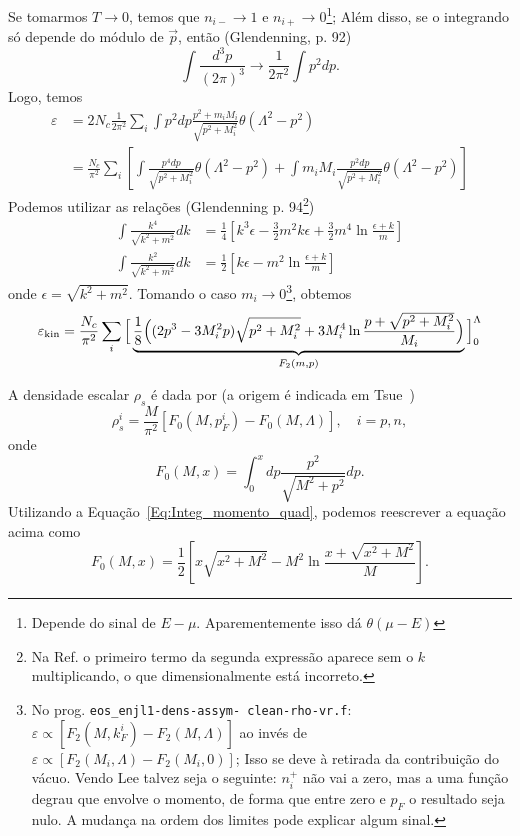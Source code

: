 Se tomarmos $T \to 0$, temos que $n_{i-} \to 1$ e $n_{i+} \to 0$\footnote{Depende do sinal de $E - \mu$. Aparementemente isso dá $\theta(\mu-E)$}; Além disso, se o integrando só depende do módulo de $\vec{p}$, então (Glendenning\cite{Glendenning}, p. 92)
\begin{equation}\label{Eq:Int_d3p_to_dp}
	\int\frac{d^3p}{(2\pi)^3} \to \frac{1}{2\pi^2}\int p^2dp.
\end{equation}
%
Logo, temos
\begin{align}
	\varepsilon &= 2 N_c \frac{1}{2\pi^2}\sum_i \int p^2 dp \frac{p^2 + m_i M_i}{\sqrt{p^2 + M_i^2}} \theta(\Lambda^2 - p^2) \\
	&= \frac{N_c}{\pi^2}\sum_i\left[\int \frac{p^4dp}{\sqrt{p^2 + M_i^2}}\theta(\Lambda^2 - p^2) + \int m_i M_i \frac{p^2 dp}{\sqrt{p^2 + M_i^2}}\theta(\Lambda^2 - p^2)\right] \label{Eq:Engergia_cin_separada}
\end{align}
%
Podemos utilizar as relações (Glendenning\cite{Glendenning} p. 94\footnote{Na Ref. o primeiro termo da segunda expressão aparece sem o $k$ multiplicando, o que dimensionalmente está incorreto.})
\begin{align}
	\int \frac{k^4}{\sqrt{k^2 + m^2}} dk &= \frac{1}{4}\left[k^3\epsilon - \frac{3}{2} m^2k\epsilon + \frac{3}{2}m^4\ln\frac{\epsilon + k}{m} \right]\\
	\int \frac{k^2}{\sqrt{k^2 + m^2}} dk &= \frac{1}{2}\left[k\epsilon - m^2\ln\frac{\epsilon + k}{m}\right] \label{Eq:Integ_momento_quad}
\end{align}
%
onde $\epsilon = \sqrt{k^2+m^2}$. Tomando o caso $m_i \to 0$\footnote{No prog. \texttt{eos\_enjl1-dens-assym- clean-rho-vr.f}: $\varepsilon \propto [F_2(M, k_F^i) - F_2(M, \Lambda)]$ ao invés de $\varepsilon \propto [F_2(M_i, \Lambda) - F_2(M_i, 0)]$; Isso se deve à retirada da contribuição do vácuo. Vendo Lee \etal talvez seja o seguinte: $n_i^+$ não vai a zero, mas a uma função degrau que envolve o momento, de forma que entre zero e $p_F$ o resultado seja nulo. A mudança na ordem dos limites pode explicar algum sinal.}, obtemos
\begin{equation}\label{Eq:Energia_kin}
	\varepsilon_{\rm{kin}} = \frac{N_c}{\pi^2}\sum_i \Big[\underbrace{\frac{1}{8}\Big((2p^3 - 3M_i^2p)\sqrt{p^2 + M_i^2} + 3M_i^4\ln\frac{p + \sqrt{p^2 + M_i^2}}{M_i}\Big)}_{F_2(m,p)}\Big]_0^\Lambda
\end{equation}

A densidade escalar $\rho_s$ é dada por (a origem é indicada em Tsue~\cite{japoneses})
\begin{equation}\label{Eq:Dens_Escalar}
	\rho_s^i = \frac{M}{\pi^2}[F_0(M, p_F^i) - F_0(M, \Lambda)], \quad i = p, n,
\end{equation}
%
onde
\begin{equation}\label{Eq:Def_F0}
	F_0(M, x) = \int_0^x dp\frac{p^2}{\sqrt{M^2 + p^2}} dp.
\end{equation}
%
Utilizando a Equação~\eqref{Eq:Integ_momento_quad}, podemos reescrever a equação acima como
\begin{equation}\label{Eq:Def_F0_integrado}
	F_0(M, x) = \frac{1}{2}\left[x\sqrt{x^2+M^2} - M^2 \ln \frac{x + \sqrt{x^2+M^2}}{M}\right].
\end{equation}

